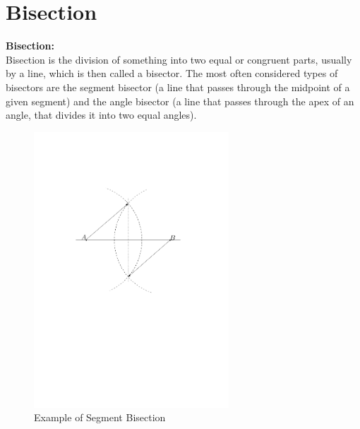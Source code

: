\newpage

\section{Bisection}

\begin{mydef}
	\textbf{Bisection:} \\ 
	Bisection is the division of something into
	two equal or congruent parts, usually by a line, which is then called a
	bisector. The most often considered types of bisectors are the segment
	bisector (a line that passes through the midpoint of a given segment) and
	the angle bisector (a line that passes through the apex of an angle, that
	divides it into two equal angles).\cite{Bisector-collinearity-convexPoly}
\end{mydef}

\begin{figure}[H] 
	\centering
	\includegraphics[width=0.65\textwidth]{figures/bisector.pdf} 
	\caption{Example of Segment Bisection} 
	\label{fig:SegmentBisection} 
\end{figure}

\newpage
{}

\newpage
\printindex

